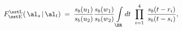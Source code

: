 \begin{equation}\label{fuscoeff1}\begin{aligned}
F_{\rm\sst E}^{\rm \sst L}(\,\al_s\,|\,\al_t)\;=\;
\frac{s_b(u_1)}{s_b(u_2)}\frac{s_b(w_1)}{s_b(w_2)}
\int\limits_{\BR}dt\;\,\prod_{i=1}^4\;\frac{s_b(t-r_i)}{s_b(t-s_i)},
\end{aligned}\end{equation}

